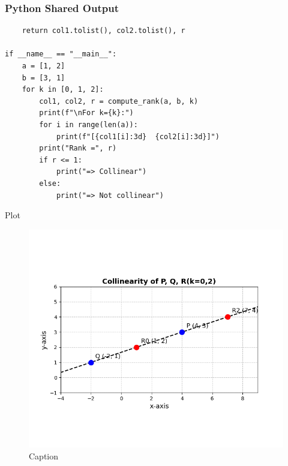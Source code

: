 \documentclass{beamer}
\begin{document}
\begin{frame}[fragile]
    \frametitle{Python Shared Output}
    \begin{lstlisting}
    return col1.tolist(), col2.tolist(), r

if __name__ == "__main__":
    a = [1, 2]
    b = [3, 1]
    for k in [0, 1, 2]:
        col1, col2, r = compute_rank(a, b, k)
        print(f"\nFor k={k}:")
        for i in range(len(a)):
            print(f"[{col1[i]:3d}  {col2[i]:3d}]")
        print("Rank =", r)
        if r <= 1:
            print("=> Collinear")
        else:
            print("=> Not collinear")
    \end{lstlisting}
\end{frame}
\begin{frame}{Plot}
    \begin{figure}
        \centering
        \includegraphics[width=1.0\linewidth]{figs/fig 1.png}
        \caption{Caption}
        \label{fig:placeholder}
    \end{figure}
\end{frame}
\end{document}
